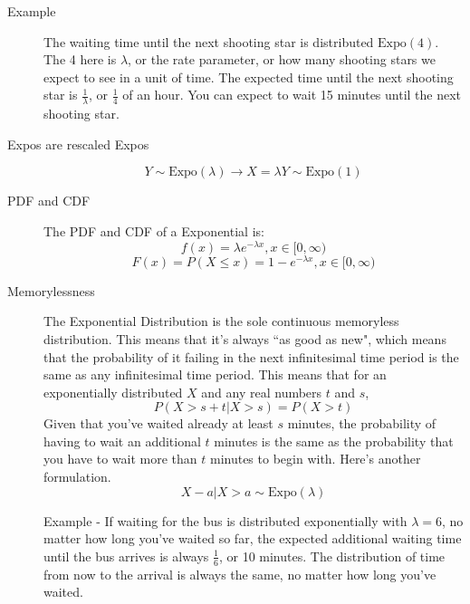 \documentclass[10pt,landscape]{article}
\theoremstyle{definition}
\newcommand{\Expo}{\textrm{Expo}}
\begin{document}
\begin{multicols}{3}
\begin{description}
\begin{description}
\begin{description}
    \item[Example] The waiting time until the next shooting star is distributed $\Expo(4)$. The 4 here is $\lambda$, or the rate parameter, or how many shooting stars we expect to see in a unit of time. The expected time until the next shooting star is $\frac{1}{\lambda}$, or $\frac{1}{4}$ of an hour. You can expect to wait 15 minutes until the next shooting star.
    
    \item[Expos are rescaled Expos]
        \[Y \sim \Expo(\lambda) \rightarrow X = \lambda Y \sim \Expo(1)\]
     
    \item[PDF and CDF] The PDF and CDF of a Exponential is:
\[f(x) = \lambda e^{-\lambda x}, x \in [0, \infty)\]
\[F(x) = P(X \leq x) = 1 - e^{-\lambda x}, x \in [0, \infty)\]
    
    \item[Memorylessness] The Exponential Distribution is the sole continuous memoryless distribution. This means that it's always ``as good as new", which means that the probability of it failing in the next infinitesimal time period is the same as any infinitesimal time period. This means that for an exponentially distributed $X$ and any real numbers $t$ and $s$,
    \[P(X > s + t | X > s) = P(X > t)\]
    Given that you've waited already at least $s$ minutes, the probability of having to wait an additional $t$ minutes is the same as the probability that you have to wait more than $t$ minutes to begin with. Here's another formulation.
    \[X - a | X > a \sim \Expo(\lambda)\]

    Example - If waiting for the bus is distributed exponentially with $\lambda = 6$, no matter how long you've waited so far, the expected additional waiting time until the bus arrives is always $\frac{1}{6}$, or 10 minutes. The distribution of time from now to the arrival is always the same, no matter how long you've waited.

    

\end{description}


\end{description}
\end{description}
\end{multicols}
\end{document}
